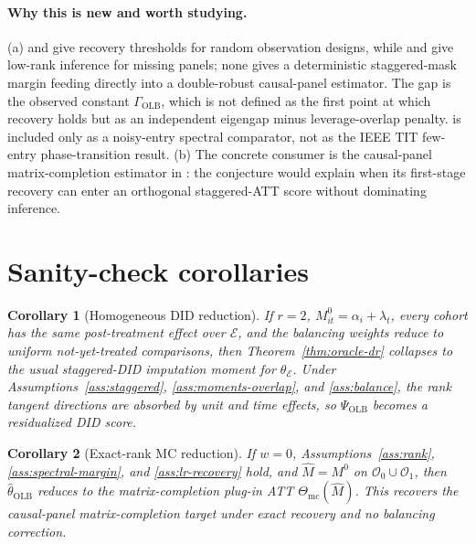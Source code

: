 \documentclass[11pt]{article}
\theoremstyle{definition}
\theoremstyle{plain}
\newtheorem{corollary}{Corollary}
\theoremstyle{remark}
\begin{document}
\paragraph{Why this is new and worth studying.}
(a) \citet[Theorem 1.2]{CandesTao2010} and \citet[Theorem 1.1]{KeshavanMontanariOhFew2010} give recovery thresholds for random observation designs, while \citet[Sections 2--3]{ChoiKwonLiao2024} and \citet[Sections 2--3]{YanWainwright2024} give low-rank inference for missing panels; none gives a deterministic staggered-mask margin feeding directly into a double-robust causal-panel estimator.  The gap is the observed constant \(\Gamma_{\mathrm{OLB}}\), which is not defined as the first point at which recovery holds but as an independent eigengap minus leverage-overlap penalty.  \citet{KeshavanMontanariOhNoisy2010} is included only as a noisy-entry spectral comparator, not as the IEEE TIT few-entry phase-transition result.  (b) The concrete consumer is the causal-panel matrix-completion estimator in \citet{AtheyBayatiDoudchenkoImbensKhosravi2021}: the conjecture would explain when its first-stage recovery can enter an orthogonal staggered-ATT score without dominating inference.

\section{Sanity-check corollaries}
\begin{corollary}[Homogeneous DID reduction]\label{cor:homogeneous-did}
If \(r=2\), \(M^0_{it}=\alpha_i+\lambda_t\), every cohort has the same post-treatment effect over \(\mathcal{E}\), and the balancing weights reduce to uniform not-yet-treated comparisons, then Theorem~\ref{thm:oracle-dr} collapses to the usual staggered-DID imputation moment for \(\theta_{\mathcal{E}}\).  Under Assumptions~\ref{ass:staggered}, \ref{ass:moments-overlap}, and \ref{ass:balance}, the rank tangent directions are absorbed by unit and time effects, so \(\Psi_{\mathrm{OLB}}\) becomes a residualized DID score.
\end{corollary}

\begin{corollary}[Exact-rank MC reduction]\label{cor:mc-reduction}
If \(w=0\), Assumptions~\ref{ass:rank}, \ref{ass:spectral-margin}, and \ref{ass:lr-recovery} hold, and \(\widehat M=M^0\) on \(\mathcal{O}_0\cup\mathcal{O}_1\), then \(\widehat\theta_{\mathrm{OLB}}\) reduces to the matrix-completion plug-in ATT \(\Theta_{\mathrm{mc}}(\widehat M)\).  This recovers the causal-panel matrix-completion target under exact recovery and no balancing correction.
\end{corollary}
\end{document}
